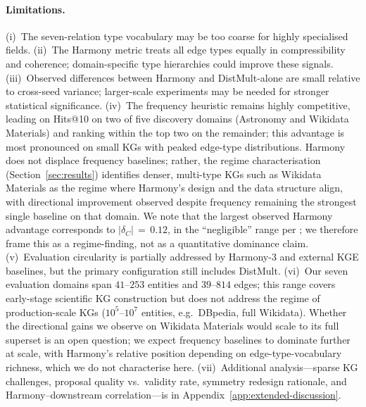\paragraph{Limitations.}
(i)~The seven-relation type vocabulary may be too coarse for highly specialised
fields.
(ii)~The Harmony metric treats all edge types equally in compressibility and
coherence; domain-specific type hierarchies could improve these signals.
(iii)~Observed differences between Harmony and DistMult-alone are small
relative to cross-seed variance; larger-scale experiments may be needed for
stronger statistical significance.
(iv)~The frequency heuristic remains highly competitive, leading on Hits@10 on
two of five discovery domains (Astronomy and Wikidata Materials) and ranking
within the top two on the remainder; this advantage is most pronounced on
small KGs with peaked edge-type distributions.  Harmony does not displace
frequency baselines; rather, the regime characterisation
(Section~\ref{sec:results}) identifies denser, multi-type KGs such as
Wikidata Materials as the regime where Harmony's design and the data
structure align, with directional improvement observed despite
frequency remaining the strongest single baseline on that domain.  We
note that the largest observed Harmony advantage corresponds to
$|\delta_C|\,=\,0.12$, in the ``negligible'' range per
\citet{cliff1993dominance}; we therefore frame this as a regime-finding,
not as a quantitative dominance claim.
(v)~Evaluation circularity is partially addressed by Harmony-3 and external
KGE baselines, but the primary configuration still includes DistMult.
(vi)~Our seven evaluation domains span $41$--$253$ entities and
$39$--$814$ edges; this range covers early-stage scientific KG
construction but does not address the regime of production-scale KGs
($10^5$--$10^7$ entities, e.g.\ DBpedia, full Wikidata).  Whether the
directional gains we observe on Wikidata Materials would scale to its
full superset is an open question; we expect frequency baselines to
dominate further at scale, with Harmony's relative position depending
on edge-type-vocabulary richness, which we do not characterise here.
(vii)~Additional analysis---sparse KG challenges, proposal quality vs.\
validity rate, symmetry redesign rationale, and Harmony--downstream
correlation---is in Appendix~\ref{app:extended-discussion}.

